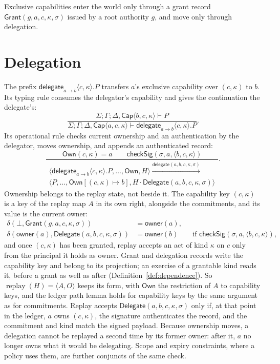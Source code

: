 \documentclass[11pt,openany]{book}
\theoremstyle{remark}
\newcommand{\replay}{\operatorname{replay}}
\begin{document}
Exclusive capabilities enter the world only through a grant record
$\mathsf{Grant}(g,a,c,\kappa,\sigma)$ issued by a root authority $g$, and
move only through delegation.

\section{Delegation}

The prefix $\mathsf{delegate}_{a\to b}\langle c,\kappa\rangle.P$
transfers $a$'s exclusive capability over $(c,\kappa)$ to $b$. Its typing
rule consumes the delegator's capability and gives the continuation the
delegate's:
\[
\frac{\Sigma;\Gamma;\Delta,\mathsf{Cap}\langle b,c,\kappa\rangle\vdash P}
{\Sigma;\Gamma;\Delta,\mathsf{Cap}\langle a,c,\kappa\rangle\vdash
\mathsf{delegate}_{a\to b}\langle c,\kappa\rangle.P}.
\]
Its operational rule checks current ownership and an authentication by
the delegator, moves ownership, and appends an authenticated record:
{\small
\[
\frac{\mathsf{Own}(c,\kappa)=a\qquad
\mathsf{checkSig}(\sigma,a,\langle b,c,\kappa\rangle)}
{\begin{array}{c}\langle\mathsf{delegate}_{a\to b}\langle c,\kappa\rangle.P,\ldots,
\mathsf{Own},H\rangle
\xrightarrow{\mathsf{delegate}(a,b,c,\kappa,\sigma)}\\
\langle P,\ldots,\mathsf{Own}[(c,\kappa)\mapsto b],
H\cdot\mathsf{Delegate}(a,b,c,\kappa,\sigma)\rangle\end{array}}.
\]
}
Ownership belongs to the replay state, not beside it. The capability
key $(c,\kappa)$ is a key of the replay map $A$ in its own right, alongside
the commitments, and its value is the current owner:
\[
\begin{aligned}
\delta(\bot,\mathsf{Grant}(g,a,c,\kappa,\sigma))&=\mathsf{owner}(a),\\
\delta(\mathsf{owner}(a),\mathsf{Delegate}(a,b,c,\kappa,\sigma))
&=\mathsf{owner}(b)\qquad\text{if }\mathsf{checkSig}(\sigma,a,\langle b,c,\kappa\rangle),
\end{aligned}
\]
and once $(c,\kappa)$ has been granted, replay accepts an act of kind
$\kappa$ on $c$ only from the principal it holds as owner. Grant and
delegation records write the capability key and belong to its
projection; an exercise of a grantable kind reads it, before a grant as
well as after (Definition~\ref{def:dependence}). So
$\replay(H)=\langle A,O\rangle$ keeps its form, with $\mathsf{Own}$ the
restriction of $A$ to capability keys, and the ledger path lemma holds for
capability keys by the same argument as for commitments. Replay accepts
$\mathsf{Delegate}(a,b,c,\kappa,\sigma)$ only if, at that point in the
ledger, $a$ owns $(c,\kappa)$, the signature authenticates the record, and
the commitment and kind match the signed payload. Because ownership
moves, a delegation cannot be replayed a second time by its former owner:
after it, $a$ no longer owns what it would be delegating. Scope and expiry
constraints, where a policy uses them, are further conjuncts of the same
check.
\end{document}
